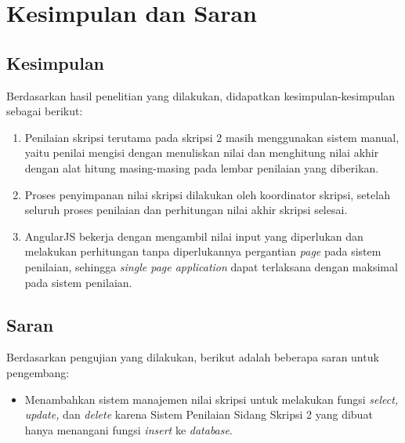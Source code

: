 \chapter{Kesimpulan dan Saran}
\label{chap: kesimpulan}

\section{Kesimpulan}
\label{sec: kesimpulan}
	
	Berdasarkan hasil penelitian yang dilakukan, didapatkan kesimpulan-kesimpulan sebagai berikut:
	\begin{enumerate}
		\item Penilaian skripsi terutama pada skripsi 2 masih menggunakan sistem manual, yaitu penilai mengisi dengan menuliskan nilai dan menghitung nilai akhir dengan alat hitung masing-masing pada lembar penilaian yang diberikan.
		\item Proses penyimpanan nilai skripsi dilakukan oleh koordinator skripsi, setelah seluruh proses penilaian dan perhitungan nilai akhir skripsi selesai.
		\item AngularJS bekerja dengan mengambil nilai input yang diperlukan dan melakukan perhitungan tanpa diperlukannya pergantian \textit{page} pada sistem penilaian, sehingga \textit{single page application} dapat terlaksana dengan maksimal pada sistem penilaian.
	\end{enumerate}

\section{Saran}
\label{sec: saran}

	Berdasarkan pengujian yang dilakukan, berikut adalah beberapa saran untuk pengembang:
	\begin{itemize}
		\item Menambahkan sistem manajemen nilai skripsi untuk melakukan fungsi \textit{select, update,} dan \textit{delete} karena Sistem Penilaian Sidang Skripsi 2 yang dibuat hanya menangani fungsi \textit{insert} ke \textit{database}.
	\end{itemize}
	